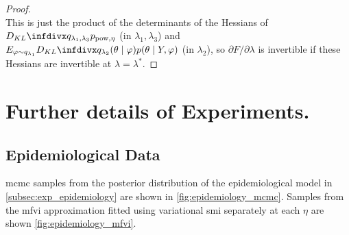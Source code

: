 \begin{proof}
\[  \]
  This is just the product of the determinants of the Hessians of $\kl{q_{\lambda_1,\lambda_3}}{p_{\pow, \eta}}$ (in $\lambda_1,\lambda_3$) and $E_{\varphi\sim q_{\lambda_1}}\kl{q_{\lambda_2}(\theta\mid \varphi)}{p(\theta \mid Y,\varphi)}$ (in $\lambda_2$), so $\partial F/\partial\lambda$ is invertible if these Hessians are invertible at $\lambda=\lambda^*$.
\end{proof}





\section{Further details of Experiments.} \label{sec:experiments_extra}

\subsection{Epidemiological Data} \label{sec:epidemiology_extra}

\acrshort*{mcmc} samples from the posterior distribution of the epidemiological model in \cref{subsec:exp_epidemiology} are shown in \cref{fig:epidemiology_mcmc}.
Samples from the \acrshort*{mfvi} approximation fitted using variational \acrshort*{smi} separately at each $\eta$ are shown \cref{fig:epidemiology_mfvi}.

